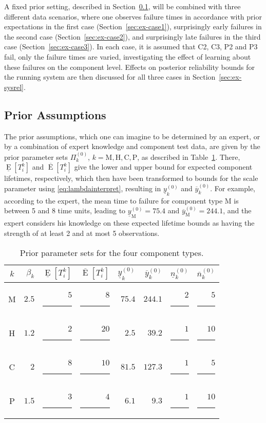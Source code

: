 \documentclass[Journal,letterpaper]{ascelike-new}
\newcommand{\uz}{^{(0)}} %
\newcommand{\ul}[1]{\underline{#1}}
\newcommand{\ol}[1]{\overline{#1}}
\newcommand{\El}{\ul{\operatorname{E}}}
\newcommand{\Eu}{\ol{\operatorname{E}}}
\def\ykzl{\ul{y}\uz_k}
\def\ykzu{\ol{y}\uz_k}
\newcommand{\ykzlfun}[1]{\ul{y}\uz_{#1}}
\newcommand{\ykzufun}[1]{\ol{y}\uz_{#1}}
\def\nkzl{\ul{n}\uz_k}
\def\nkzu{\ol{n}\uz_k}
\def\PkZ{\Pi\uz_k}
\newcommand{\PZi}[1]{\Pi\uz_{#1}}
\begin{document}
A fixed prior setting, described in Section~\ref{sec:ex-prior},
will be combined with three different data scenarios,
where one observes failure times in accordance with prior expectations in the first case (Section~\ref{sec:ex-case1}),
surprisingly early failures in the second case (Section~\ref{sec:ex-case2}), and
surprisingly late failures in the third case (Section~\ref{sec:ex-case3}).
In each case, it is assumed that C2, C3, P2 and P3 fail, only the failure times are varied,
investigating the effect of learning about these failures on the component level.
Effects on posterior reliability bounds for the running system
are then discussed for all three cases in Section~\ref{sec:ex-sysrel}.

\subsection{Prior Assumptions}
\label{sec:ex-prior}

The prior assumptions, which one can imagine to be determined by an expert,
or by a combination of expert knowledge and component test data,
are given by the prior parameter sets $\PkZ$, $k=\text{M}, \text{H}, \text{C}, \text{P}$,
as described in Table~\ref{tab:priorparamsets}.
There, $\El[T_i^k]$ and $\Eu[T_i^k]$ give the lower and upper bound for expected component lifetimes, respectively,
which then have been transformed to bounds for the scale parameter using \eqref{eq:lambdainterpret},
resulting in $\ykzl$ and $\ykzu$.
For example, according to the expert, the mean time to failure for component type M is between 5 and 8 time units,
leading to $\ykzlfun{\text{M}} = 75.4$ and $\ykzufun{\text{M}} = 244.1$,
and the expert considers his knowledge on these expected lifetime bounds
as having the strength of at least 2 and at most 5 observations.  
\begin{table}
\caption{Prior parameter sets for the four component types.}
\label{tab:priorparamsets}
\centering
\begin{tabular}{crrrrrrr}
  \toprule
$k$ & $\beta_k$ & $\El[T_i^k]$ & $\Eu[T_i^k]$ & $\ykzl$ & $\ykzu$ & $\nkzl$ & $\nkzu$ \\
  \midrule
M & $2.5$ & $5$\rule{1.5ex}{0ex} & $ 8$\rule{1.5ex}{0ex} & $75.4$ & $244.1$ & $2$\rule{1ex}{0ex} & $ 5$\rule{1ex}{0ex} \\
H & $1.2$ & $2$\rule{1.5ex}{0ex} & $20$\rule{1.5ex}{0ex} & $ 2.5$ & $ 39.2$ & $1$\rule{1ex}{0ex} & $10$\rule{1ex}{0ex} \\
C & $2  $ & $8$\rule{1.5ex}{0ex} & $10$\rule{1.5ex}{0ex} & $81.5$ & $127.3$ & $1$\rule{1ex}{0ex} & $ 5$\rule{1ex}{0ex} \\
P & $1.5$ & $3$\rule{1.5ex}{0ex} & $ 4$\rule{1.5ex}{0ex} & $ 6.1$ & $  9.3$ & $1$\rule{1ex}{0ex} & $10$\rule{1ex}{0ex} \\
  \bottomrule
\end{tabular}
\end{table}
\end{document}
